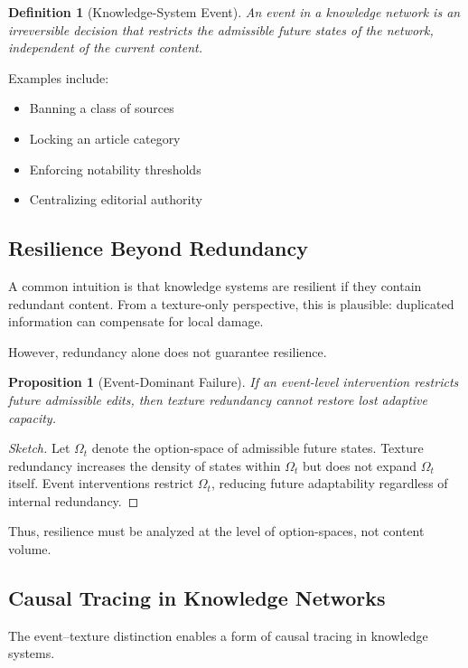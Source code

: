 \documentclass[11pt]{article}
\newtheorem{definition}{Definition}
\newtheorem{proposition}{Proposition}
\theoremstyle{remark}
\begin{document}
\begin{definition}[Knowledge-System Event]
An event in a knowledge network is an irreversible decision that
restricts the admissible future states of the network, independent of
the current content.
\end{definition}

Examples include:
\begin{itemize}
\item Banning a class of sources
\item Locking an article category
\item Enforcing notability thresholds
\item Centralizing editorial authority
\end{itemize}

\subsection{Resilience Beyond Redundancy}

A common intuition is that knowledge systems are resilient if they
contain redundant content. From a texture-only perspective, this is
plausible: duplicated information can compensate for local damage.

However, redundancy alone does not guarantee resilience.

\begin{proposition}[Event-Dominant Failure]
If an event-level intervention restricts future admissible edits,
then texture redundancy cannot restore lost adaptive capacity.
\end{proposition}

\begin{proof}[Sketch]
Let $\Omega_t$ denote the option-space of admissible future states.
Texture redundancy increases the density of states within $\Omega_t$
but does not expand $\Omega_t$ itself. Event interventions restrict
$\Omega_t$, reducing future adaptability regardless of internal
redundancy.
\end{proof}

Thus, resilience must be analyzed at the level of option-spaces, not
content volume.

\subsection{Causal Tracing in Knowledge Networks}

The event–texture distinction enables a form of causal tracing in
knowledge systems.
\end{document}
